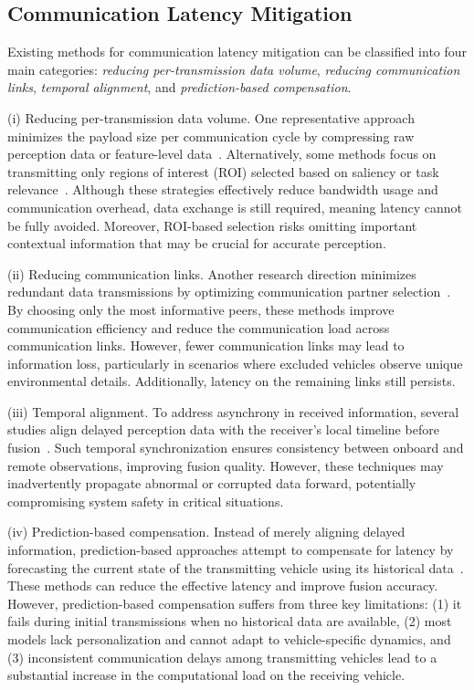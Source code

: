 \subsection{Communication Latency Mitigation}
Existing methods for communication latency mitigation can be classified into four main categories: \emph{reducing per-transmission data volume}, \emph{reducing communication links}, \emph{temporal alignment}, and \emph{prediction-based compensation}.

(i) Reducing per-transmission data volume.  
One representative approach minimizes the payload size per communication cycle by compressing raw perception data or feature-level data~\cite{xu2022opv2v,wang2023vimi,zheng2024real}. Alternatively, some methods focus on transmitting only regions of interest (ROI) selected based on saliency or task relevance~\cite{yuan2022keypoints,lohdefink2020focussing,hu2022where2comm}. Although these strategies effectively reduce bandwidth usage and communication overhead, data exchange is still required, meaning latency cannot be fully avoided. Moreover, ROI-based selection risks omitting important contextual information that may be crucial for accurate perception.

(ii) Reducing communication links.  
Another research direction minimizes redundant data transmissions by optimizing communication partner selection~\cite{liu2020who2com,qu2024model}. By choosing only the most informative peers, these methods improve communication efficiency and reduce the communication load across communication links. However, fewer communication links may lead to information loss, particularly in scenarios where excluded vehicles observe unique environmental details. Additionally, latency on the remaining links still persists.

(iii) Temporal alignment.  
To address asynchrony in received information, several studies align delayed perception data with the receiver’s local timeline before fusion~\cite{liu2024select2col,liu2024v2x,lin2024v2vformer,lei2024robust,bai2023vinet}. Such temporal synchronization ensures consistency between onboard and remote observations, improving fusion quality. However, these techniques may inadvertently propagate abnormal or corrupted data forward, potentially compromising system safety in critical situations.

(iv) Prediction-based compensation.  
Instead of merely aligning delayed information, prediction-based approaches attempt to compensate for latency by forecasting the current state of the transmitting vehicle using its historical data~\cite{wang2025cmp,rossle2024unlocking,fang2024pacp,yu2023vehicle,lei2022latency}. These methods can reduce the effective latency and improve fusion accuracy. However, prediction-based compensation suffers from three key limitations: (1) it fails during initial transmissions when no historical data are available, (2) most models lack personalization and cannot adapt to vehicle-specific dynamics, and (3) inconsistent communication delays among transmitting vehicles lead to a substantial increase in the computational load on the receiving vehicle.








